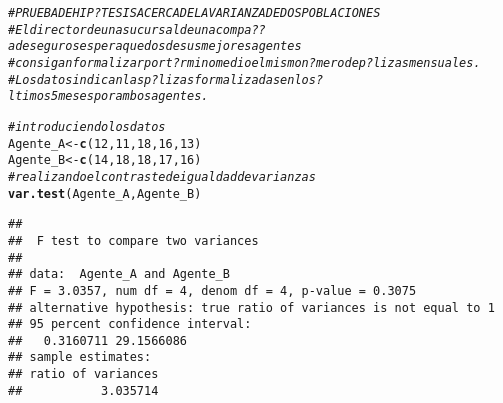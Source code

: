 \documentclass[10pt,a4paper]{article}\usepackage[]{graphicx}\usepackage[]{color}
\makeatletter
\newcommand{\hlnum}[1]{\textcolor[rgb]{0.686,0.059,0.569}{#1}}%
\newcommand{\hlcom}[1]{\textcolor[rgb]{0.678,0.584,0.686}{\textit{#1}}}%
\newcommand{\hlstd}[1]{\textcolor[rgb]{0.345,0.345,0.345}{#1}}%
\newcommand{\hlkwb}[1]{\textcolor[rgb]{0.69,0.353,0.396}{#1}}%
\newcommand{\hlkwd}[1]{\textcolor[rgb]{0.737,0.353,0.396}{\textbf{#1}}}%
\newenvironment{kframe}{%
 \def\at@end@of@kframe{}%
 \ifinner\ifhmode%
  \def\at@end@of@kframe{\end{minipage}}%
  \begin{minipage}{\columnwidth}%
 \fi\fi%
 \def\FrameCommand##1{\hskip\@totalleftmargin \hskip-\fboxsep
 \colorbox{shadecolor}{##1}\hskip-\fboxsep
     \hskip-\linewidth \hskip-\@totalleftmargin \hskip\columnwidth}%
 \MakeFramed {\advance\hsize-\width
   \@totalleftmargin\z@ \linewidth\hsize
   \@setminipage}}%
 {\par\unskip\endMakeFramed%
 \at@end@of@kframe}
\newenvironment{knitrout}{}{} %
\makeatother
\begin{document}
\begin{knitrout}
\begin{kframe}
\begin{alltt}
\hlcom{#PRUEBA DE HIP?TESIS ACERCA DE LA VARIANZA DE DOS POBLACIONES }
\hlcom{#El director de una sucursal de una compa??a deseguros espera que dos de sus mejores agentes }
\hlcom{#consigan formalizar por t?rmino medio el mismo n?mero de p?lizas mensuales.}
\hlcom{#Los datos indican las p?lizas formalizadas en los ?ltimos 5 meses por ambos agentes. }


\hlcom{#introduciendo los datos }
\hlstd{Agente_A} \hlkwb{<-} \hlkwd{c}\hlstd{(}\hlnum{12}\hlstd{,} \hlnum{11}\hlstd{,} \hlnum{18}\hlstd{,} \hlnum{16}\hlstd{,} \hlnum{13}\hlstd{)}
\hlstd{Agente_B} \hlkwb{<-} \hlkwd{c}\hlstd{(}\hlnum{14}\hlstd{,} \hlnum{18}\hlstd{,} \hlnum{18}\hlstd{,} \hlnum{17}\hlstd{,} \hlnum{16}\hlstd{)}
\hlcom{# realizando el contraste de igualdad de varianzas }
\hlkwd{var.test}\hlstd{(Agente_A, Agente_B)}
\end{alltt}
\begin{verbatim}
## 
## 	F test to compare two variances
## 
## data:  Agente_A and Agente_B
## F = 3.0357, num df = 4, denom df = 4, p-value = 0.3075
## alternative hypothesis: true ratio of variances is not equal to 1
## 95 percent confidence interval:
##   0.3160711 29.1566086
## sample estimates:
## ratio of variances 
##           3.035714
\end{verbatim}
\end{kframe}
\end{knitrout}
\end{document}
